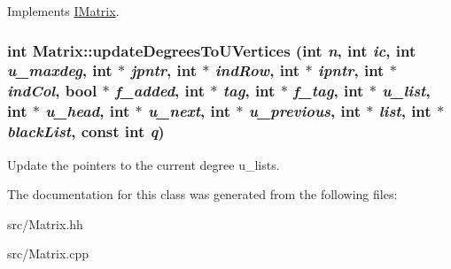Implements \hyperlink{classIMatrix_ad6d689b7a38120b6463f1965915f7163}{IMatrix}.\hypertarget{classMatrix_a7c1221aa40beeb82fdbacddcf86d58c9}{
\subsubsection[{updateDegreesToUVertices}]{\setlength{\rightskip}{0pt plus 5cm}int Matrix::updateDegreesToUVertices (int {\em n}, \/  int {\em ic}, \/  int {\em u\_\-maxdeg}, \/  int $\ast$ {\em jpntr}, \/  int $\ast$ {\em indRow}, \/  int $\ast$ {\em ipntr}, \/  int $\ast$ {\em indCol}, \/  bool $\ast$ {\em f\_\-added}, \/  int $\ast$ {\em tag}, \/  int $\ast$ {\em f\_\-tag}, \/  int $\ast$ {\em u\_\-list}, \/  int $\ast$ {\em u\_\-head}, \/  int $\ast$ {\em u\_\-next}, \/  int $\ast$ {\em u\_\-previous}, \/  int $\ast$ {\em list}, \/  int $\ast$ {\em blackList}, \/  const int {\em q})}}
\label{classMatrix_a7c1221aa40beeb82fdbacddcf86d58c9}


Update the pointers to the current degree u\_\-lists.

The documentation for this class was generated from the following files:\begin{DoxyCompactItemize}
\item 
src/Matrix.hh\item 
src/Matrix.cpp\end{DoxyCompactItemize}
